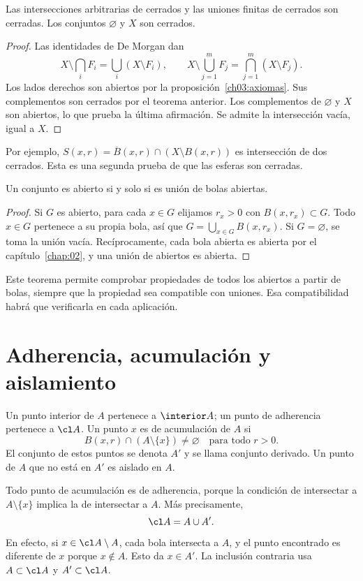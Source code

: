 \begin{corolario}\label{ch03:cerrados}
Las intersecciones arbitrarias de cerrados y las uniones finitas de cerrados son cerradas. Los conjuntos $\varnothing$ y $X$ son cerrados.
\end{corolario}
\begin{proof}
Las identidades de De Morgan dan
\[
X\setminus\bigcap_iF_i=\bigcup_i(X\setminus F_i),\qquad
X\setminus\bigcup_{j=1}^mF_j=\bigcap_{j=1}^m(X\setminus F_j).
\]
Los lados derechos son abiertos por la proposición~\ref{ch03:axiomas}. Sus complementos son cerrados por el teorema anterior. Los complementos de $\varnothing$ y $X$ son abiertos, lo que prueba la última afirmación. Se admite la intersección vacía, igual a $X$.
\end{proof}
Por ejemplo, $S(x,r)=\overline B(x,r)\cap(X\setminus B(x,r))$ es intersección de dos cerrados. Esta es una segunda prueba de que las esferas son cerradas.

\begin{teorema}\label{ch03:unionbolas}
Un conjunto es abierto si y solo si es unión de bolas abiertas.
\end{teorema}
\begin{proof}
Si $G$ es abierto, para cada $x\in G$ elijamos $r_x>0$ con $B(x,r_x)\subset G$. Todo $x\in G$ pertenece a su propia bola, así que $G=\bigcup_{x\in G}B(x,r_x)$. Si $G=\varnothing$, se toma la unión vacía. Recíprocamente, cada bola abierta es abierta por el capítulo~\ref{chap:02}, y una unión de abiertos es abierta.
\end{proof}
Este teorema permite comprobar propiedades de todos los abiertos a partir de bolas, siempre que la propiedad sea compatible con uniones. Esa compatibilidad habrá que verificarla en cada aplicación.

\section{Adherencia, acumulación y aislamiento}
\begin{definicion}
Un punto interior de $A$ pertenece a $\interior A$; un punto de adherencia pertenece a $\cl A$. Un punto $x$ es de acumulación de $A$ si
\[
B(x,r)\cap(A\setminus\{x\})\ne\varnothing\quad\text{para todo }r>0.
\]
El conjunto de estos puntos se denota $A'$ y se llama conjunto derivado. Un punto de $A$ que no está en $A'$ es aislado en $A$.
\end{definicion}
Todo punto de acumulación es de adherencia, porque la condición de intersectar a $A\setminus\{x\}$ implica la de intersectar a $A$. Más precisamente,
\begin{equation}\label{ch03:clderivada}
\cl A=A\cup A'.
\end{equation}
En efecto, si $x\in\cl A\setminus A$, cada bola intersecta a $A$, y el punto encontrado es diferente de $x$ porque $x\notin A$. Esto da $x\in A'$. La inclusión contraria usa $A\subset\cl A$ y $A'\subset\cl A$.

